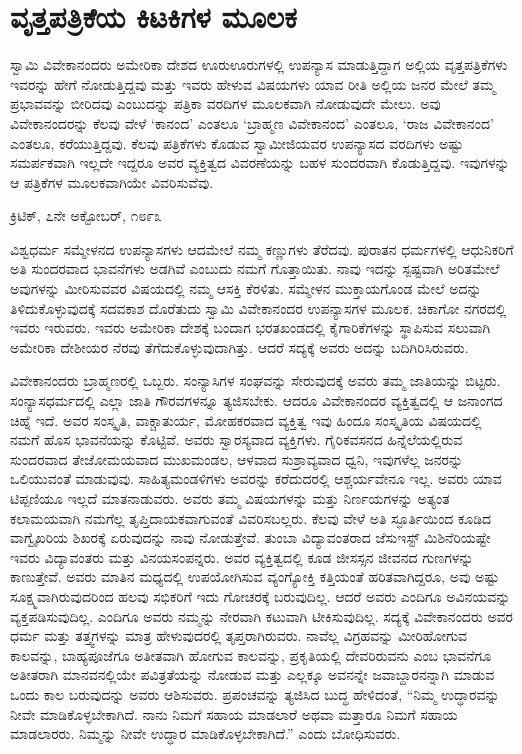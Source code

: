 
\chapter{ವೃತ್ತಪತ್ರಿಕೆಯ ಕಿಟಕಿಗಳ ಮೂಲಕ}

\vskip 3pt

ಸ್ವಾಮಿ ವಿವೇಕಾನಂದರು ಅಮೇರಿಕಾ ದೇಶದ ಊರುಊರುಗಳಲ್ಲಿ ಉಪನ್ಯಾಸ ಮಾಡುತ್ತಿದ್ದಾಗ ಅಲ್ಲಿಯ ವೃತ್ತಪತ್ರಿಕೆಗಳು ಇವರನ್ನು ಹೇಗೆ ನೋಡುತ್ತಿದ್ದವು ಮತ್ತು ಇವರು ಹೇಳುವ ವಿಷಯಗಳು ಯಾವ ರೀತಿ ಅಲ್ಲಿಯ ಜನರ ಮೇಲೆ ತಮ್ಮ ಪ್ರಭಾವವನ್ನು ಬೀರಿದವು ಎಂಬುದನ್ನು ಪತ್ರಿಕಾ ವರದಿಗಳ ಮೂಲಕವಾಗಿ ನೋಡುವುದೇ ಮೇಲು. ಅವು ವಿವೇಕಾನಂದರನ್ನು ಕೆಲವು ವೇಳೆ ‘ಕಾನಂದ’ ಎಂತಲೂ ‘ಬ್ರಾಹ್ಮಣ ವಿವೇಕಾನಂದ’ ಎಂತಲೂ, ‘ರಾಜ ವಿವೇಕಾನಂದ’ ಎಂತಲೂ, ಕರೆಯುತ್ತಿದ್ದವು. ಕೆಲವು ಪತ್ರಿಕೆಗಳು ಕೊಡುವ ಸ್ವಾಮೀಜಿಯವರ ಉಪನ್ಯಾಸದ ವರದಿಗಳು ಅಷ್ಟು ಸಮರ್ಪಕವಾಗಿ ಇಲ್ಲದೇ ಇದ್ದರೂ ಅವರ ವ್ಯಕ್ತಿತ್ವದ ವಿವರಣೆಯನ್ನು ಬಹಳ ಸುಂದರವಾಗಿ ಕೊಡುತ್ತಿದ್ದವು. ಇವುಗಳನ್ನು ಆ ಪತ್ರಿಕೆಗಳ ಮೂಲಕವಾಗಿಯೇ ವಿವರಿಸುವೆವು. 

\vskip 3pt

\begin{flushright}
ಕ್ರಿಟಿಕ್, ೭ನೇ ಅಕ್ಟೋಬರ್, ೧೮೯೩
\end{flushright}

\vskip 3pt

 ವಿಶ್ವಧರ್ಮ ಸಮ್ಮೇಳನದ ಉಪನ್ಯಾಸಗಳು ಆದಮೇಲೆ ನಮ್ಮ ಕಣ್ಣುಗಳು ತೆರೆದವು. ಪುರಾತನ ಧರ್ಮಗಳಲ್ಲಿ ಆಧುನಿಕರಿಗೆ ಅತಿ ಸುಂದರವಾದ ಭಾವನೆಗಳು ಅಡಗಿವೆ ಎಂಬುದು ನಮಗೆ ಗೊತ್ತಾಯಿತು. ನಾವು ಇದನ್ನು ಸ್ಪಷ್ಟವಾಗಿ ಅರಿತಮೇಲೆ ಅವುಗಳನ್ನು ಮೀರಿಸುವವರ ವಿಷಯದಲ್ಲಿ ನಮ್ಮ ಆಸಕ್ತಿ ಕೆರಳಿತು. ಸಮ್ಮೇಳನ ಮುಕ್ತಾಯಗೊಂಡ ಮೇಲೆ ಅದನ್ನು ತಿಳಿದುಕೊಳ್ಳುವುದಕ್ಕೆ ಸದವಕಾಶ ದೊರೆತುದು ಸ್ವಾಮಿ ವಿವೇಕಾನಂದರ ಉಪನ್ಯಾಸಗಳ ಮೂಲಕ. ಚಿಕಾಗೋ ನಗರದಲ್ಲಿ ಇವರು ಇರುವರು. ಇವರು ಅಮೇರಿಕಾ ದೇಶಕ್ಕೆ ಬಂದಾಗ ಭರತಖಂಡದಲ್ಲಿ ಕೈಗಾರಿಕೆಗಳನ್ನು ಸ್ಥಾಪಿಸುವ ಸಲುವಾಗಿ ಅಮೇರಿಕಾ ದೇಶೀಯರ ನೆರವು ತೆಗೆದುಕೊಳ್ಳುವುದಾಗಿತ್ತು. ಆದರೆ ಸದ್ಯಕ್ಕೆ ಅವರು ಅದನ್ನು ಬದಿಗಿರಿಸಿರುವರು. 

 ವಿವೇಕಾನಂದರು ಬ್ರಾಹ್ಮಣರಲ್ಲಿ ಒಬ್ಬರು. ಸಂನ್ಯಾಸಿಗಳ ಸಂಘವನ್ನು ಸೇರುವುದಕ್ಕೆ ಅವರು ತಮ್ಮ ಜಾತಿಯನ್ನು ಬಿಟ್ಟರು. ಸಂನ್ಯಾಸಧರ್ಮದಲ್ಲಿ ಎಲ್ಲಾ ಜಾತಿ ಗೌರವಗಳನ್ನೂ ತ್ಯಜಿಸಬೇಕು. ಆದರೂ ವಿವೇಕಾನಂದರ ವ್ಯಕ್ತಿತ್ವದಲ್ಲಿ ಆ ಜನಾಂಗದ ಚಿಹ್ನೆ ಇದೆ. ಅವರ ಸಂಸ್ಕೃತಿ, ವಾಕ್ಚಾತುರ್ಯ, ಮೋಹಕರವಾದ ವ್ಯಕ್ತಿತ್ವ ಇವು ಹಿಂದೂ ಸಂಸ್ಕೃತಿಯ ವಿಷಯದಲ್ಲಿ ನಮಗೆ ಹೊಸ ಭಾವನೆಯನ್ನು ಕೊಟ್ಟಿವೆ. ಅವರು ಸ್ವಾರಸ್ಯವಾದ ವ್ಯಕ್ತಿಗಳು. ಗೈರಿಕವಸನದ ಹಿನ್ನೆಲೆಯಲ್ಲಿರುವ ಸುಂದರವಾದ ತೇಜೋಮಯವಾದ ಮುಖಮಂಡಲ, ಆಳವಾದ ಸುಶ್ರಾವ್ಯವಾದ ಧ್ವನಿ, ಇವುಗಳೆಲ್ಲ ಜನರನ್ನು ಒಲಿಯುವಂತೆ ಮಾಡುವುವು. ಸಾಹಿತ್ಯಮಂಡಳಿಗಳು ಅವರನ್ನು ಕರೆದುದರಲ್ಲಿ ಆಶ್ಚರ್ಯವೇನೂ ಇಲ್ಲ. ಅವರು ಯಾವ ಟಿಪ್ಪಣಿಯೂ ಇಲ್ಲದೆ ಮಾತನಾಡುವರು. ಅವರು ತಮ್ಮ ವಿಷಯಗಳನ್ನು ಮತ್ತು ನಿರ್ಣಯಗಳನ್ನು ಅತ್ಯಂತ ಕಲಾಮಯವಾಗಿ ನಮಗೆಲ್ಲ ತೃಪ್ತಿದಾಯಕವಾಗುವಂತೆ ವಿವರಿಸಬಲ್ಲರು. ಕೆಲವು ವೇಳೆ ಅತಿ ಸ್ಫೂರ್ತಿಯಿಂದ ಕೂಡಿದ ವಾಗ್ವೈಖರಿಯ ಶಿಖರಕ್ಕೆ ಏರುವುದನ್ನು ನಾವು ನೋಡುತ್ತೇವೆ. ತುಂಬಾ ವಿದ್ಯಾವಂತರಾದ ಜೆಸುಇಸ್ಟ್ ಮಿಶಿನೆರಿಯಷ್ಟೇ ಇವರು ವಿದ್ಯಾವಂತರು ಮತ್ತು ವಿನಯಸಂಪನ್ನರು. ಅವರ ವ್ಯಕ್ತಿತ್ವದಲ್ಲಿ ಕೂಡ ಜೀಸಸ್ಸನ ಜೀವನದ ಗುಣಗಳನ್ನು ಕಾಣುತ್ತೇವೆ. ಅವರು ಮಾತಿನ ಮಧ್ಯದಲ್ಲಿ ಉಪಯೋಗಿಸುವ ವ್ಯಂಗ್ಯೋಕ್ತಿ ಕತ್ತಿಯಂತೆ ಹರಿತವಾಗಿದ್ದರೂ, ಅವು ಅಷ್ಟು ಸೂಕ್ಷ್ಮವಾಗಿರುವುದರಿಂದ ಹಲವು ಸಭಿಕರಿಗೆ ಇದು ಗೋಚರಕ್ಕೆ ಬರುವುದಿಲ್ಲ. ಆದರೆ ಅವರು ಎಂದಿಗೂ ಅವಿನಯವನ್ನು ವ್ಯಕ್ತಪಡಿಸುವುದಿಲ್ಲ. ಎಂದಿಗೂ ಅವರು ನಮ್ಮನ್ನು ನೇರವಾಗಿ ಕಟುವಾಗಿ ಟೀಕಿಸುವುದಿಲ್ಲ. ಸದ್ಯಕ್ಕೆ ವಿವೇಕಾನಂದರು ಅವರ ಧರ್ಮ ಮತ್ತು ತತ್ತ್ವಗಳನ್ನು ಮಾತ್ರ ಹೇಳುವುದರಲ್ಲಿ ತೃಪ್ತರಾಗಿರುವರು. ನಾವೆಲ್ಲ ವಿಗ್ರಹವನ್ನು ಮೀರಿಹೋಗುವ ಕಾಲವನ್ನು, ಬಾಹ್ಯಪೂಜೆಗೂ ಅತೀತವಾಗಿ ಹೋಗುವ ಕಾಲವನ್ನು, ಪ್ರಕೃತಿಯಲ್ಲಿ ದೇವರಿರುವನು ಎಂಬ ಭಾವನೆಗೂ ಅತೀತರಾಗಿ ಮಾನವನಲ್ಲಿಯೇ ಪವಿತ್ರತೆಯನ್ನು ನೋಡುವ ಮತ್ತು ಎಲ್ಲಕ್ಕೂ ಅವನನ್ನೇ ಜವಾಬ್ದಾರನನ್ನಾಗಿ ಮಾಡುವ ಒಂದು ಕಾಲ ಬರುವುದನ್ನು ಅವರು ಆಶಿಸುವರು. ಪ್ರಪಂಚವನ್ನು ತ್ಯಜಿಸಿದ ಬುದ್ಧ ಹೇಳಿದಂತೆ, “ನಿಮ್ಮ ಉದ್ಧಾರವನ್ನು ನೀವೇ ಮಾಡಿಕೊಳ್ಳಬೇಕಾಗಿದೆ. ನಾನು ನಿಮಗೆ ಸಹಾಯ ಮಾಡಲಾರೆ ಅಥವಾ ಮತ್ತಾರೂ ನಿಮಗೆ ಸಹಾಯ ಮಾಡಲಾರರು. ನಿಮ್ಮನ್ನು ನೀವೇ ಉದ್ಧಾರ ಮಾಡಿಕೊಳ್ಳಬೇಕಾಗಿದೆ.” ಎಂದು ಬೋಧಿಸುವರು.

